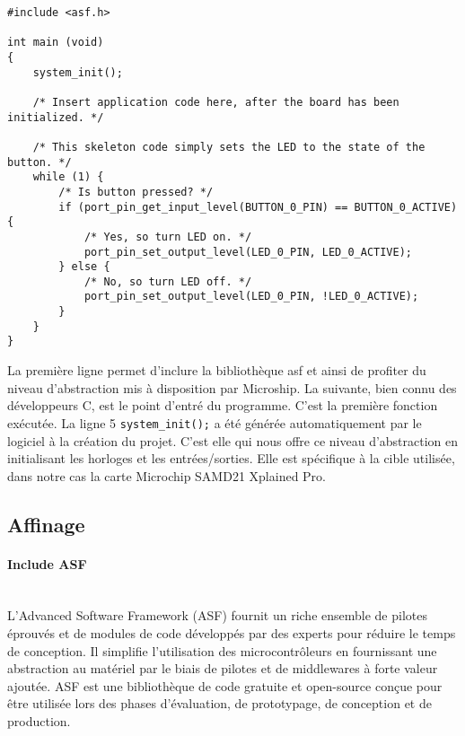 \documentclass[a4paper]{article}
\begin{document}
\begin{lstlisting}[style=CStyle]
#include <asf.h>

int main (void)
{
	system_init();
	
	/* Insert application code here, after the board has been initialized. */
	
	/* This skeleton code simply sets the LED to the state of the button. */
	while (1) {
		/* Is button pressed? */
		if (port_pin_get_input_level(BUTTON_0_PIN) == BUTTON_0_ACTIVE) {
			/* Yes, so turn LED on. */
			port_pin_set_output_level(LED_0_PIN, LED_0_ACTIVE);
		} else {
			/* No, so turn LED off. */
			port_pin_set_output_level(LED_0_PIN, !LED_0_ACTIVE);
		}
	}
}
\end{lstlisting}
La première ligne permet d'inclure la  bibliothèque asf et ainsi de profiter du niveau d'abstraction mis à disposition par Microship. La suivante, bien connu des développeurs C, est le point d'entré du programme. C'est la première fonction exécutée. La ligne 5 \texttt{system\_init();} a été générée automatiquement par le logiciel à la création du projet. C'est elle qui nous offre ce niveau d'abstraction en initialisant les horloges et les entrées/sorties. Elle est spécifique à la cible utilisée, dans notre cas la carte Microchip SAMD21 Xplained Pro.

\subsection{Affinage}

\paragraph{Include ASF}
~~\\
L'Advanced Software Framework (ASF) fournit un riche ensemble de pilotes éprouvés et de modules de code développés par des experts pour réduire le temps de conception. Il simplifie l'utilisation des microcontrôleurs en fournissant une abstraction au matériel par le biais de pilotes et de middlewares à forte valeur ajoutée. ASF est une bibliothèque de code gratuite et open-source conçue pour être utilisée lors des phases d'évaluation, de prototypage, de conception et de production.


{}

\end{document}
